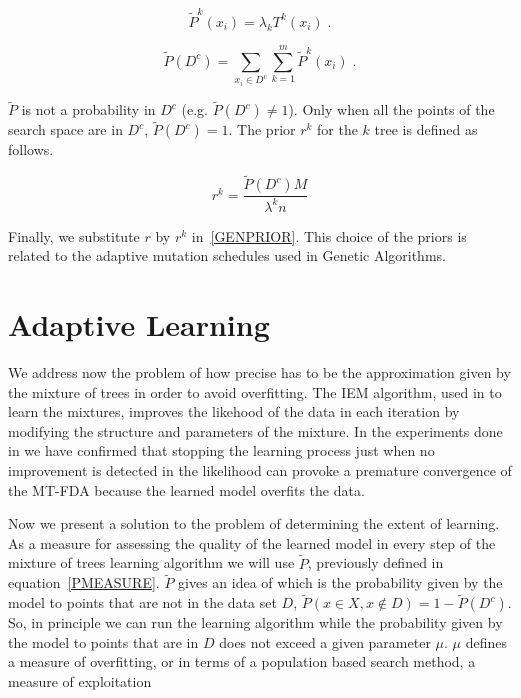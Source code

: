 \documentclass[runningheads]{llncs}
\begin{document}
\begin{equation}
 {\tilde{P}}^k(x_i) = \lambda_k T^k(x_i) \;. 
\end{equation}

\begin{equation}
 {\tilde{P}}(D^c) = \sum_{x_i \in D^c} \sum_{k=1}^{m} {\tilde{P}}^k(x_i) \;. 
 \label{PMEASURE}
\end{equation}

 $\tilde{P}$ is not a probability in $D^c$ (e.g. $\tilde{P}(D^c) \neq 1$). Only
 when all the points of the search space are in $D^c$, $\tilde{P}(D^c) = 1$. The prior $r^k$ for the $k$ tree is  defined as follows.

\begin{equation}
   r^k =  \frac{\tilde{P}(D^c)M}{{\lambda}^kn}
 \label{ADAPTPRIOR} 
\end{equation}

 Finally, we substitute $r$ by $r^k$ in~\ref{GENPRIOR}. This choice of the priors is related to the adaptive mutation schedules used in Genetic
 Algorithms.  


\section{Adaptive Learning} \label{ALEARNING}

We address now the problem of how precise has to be the approximation given by the
mixture of trees in order to avoid overfitting. The IEM algorithm, used in
\cite{Meila:1999} to learn the mixtures, improves the likehood of the data in
each iteration by modifying the structure and parameters of  the mixture. In the
experiments done in \cite{Santana_et_al:2001} we have confirmed that stopping the learning process just when 
no improvement is detected in the likelihood can provoke a premature 
convergence of the MT-FDA because the learned model overfits the data.

Now we present a solution to the problem of determining the extent of
learning. As a measure for assessing the
quality of the learned model in every step of the mixture of trees
learning algorithm we will use $\tilde{P}$, previously defined in equation~\ref{PMEASURE}. $\tilde{P}$ gives an idea of which is the probability
given by the model to points that are not in the data set $D$, $\tilde{P}(x \in X, x \notin D) = 1-\tilde{P}(D^c)$.  So, in principle we can run the learning algorithm while the
probability given by the model to points that are in $D$ does not exceed a given
parameter $\mu$. $\mu$ defines a measure of overfitting, or in  terms of a population
based search method, a measure of exploitation
\end{document}

